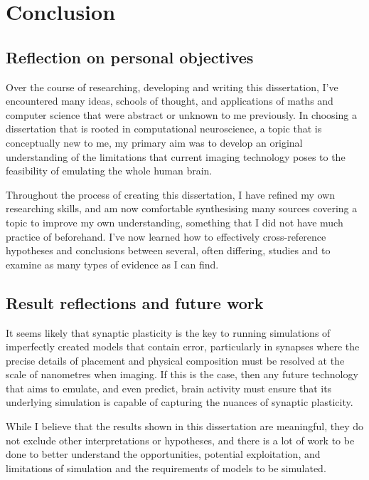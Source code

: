 \chapter{Conclusion}

\section{Reflection on personal objectives}

Over the course of researching, developing and writing this dissertation, I've
encountered many ideas, schools of thought, and applications of maths and
computer science that were abstract or unknown to me previously. In choosing a
dissertation that is rooted in computational neuroscience, a topic that is
conceptually new to me, my primary aim was to develop an original understanding
of the limitations that current imaging technology poses to the feasibility of
emulating the whole human brain. 

Throughout the process of creating this dissertation, I have refined my own
researching skills, and am now comfortable synthesising many sources covering a
topic to improve my own understanding, something that I did not have much
practice of beforehand. I've now learned how to effectively cross-reference
hypotheses and conclusions between several, often differing, studies and to
examine as many types of evidence as I can find.



\section{Result reflections and future work}

It seems likely that synaptic plasticity is the key to running simulations of
imperfectly created models that contain error, particularly in synapses where
the precise details of placement and physical composition must be resolved at
the scale of nanometres when imaging. If this is the case, then any future
technology that aims to emulate, and even predict, brain activity must ensure
that its underlying simulation is capable of capturing the nuances of synaptic
plasticity. 

While I believe that the results shown in this dissertation are meaningful, they
do not exclude other interpretations or hypotheses, and there is a lot of work
to be done to better understand the opportunities, potential exploitation, and
limitations of simulation and the requirements of models to be simulated.

